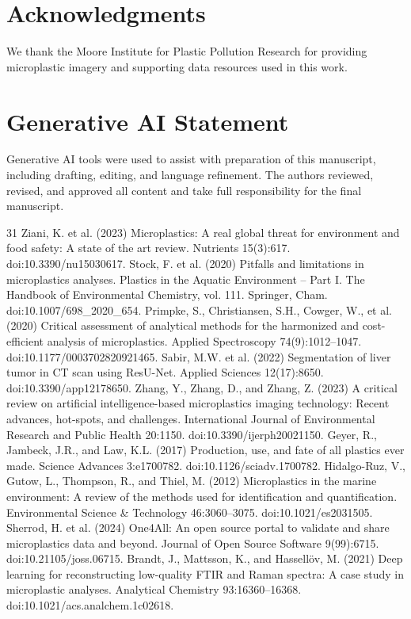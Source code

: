 \documentclass[11pt]{article}
\begin{document}
\section*{Acknowledgments}
We thank the Moore Institute for Plastic Pollution Research for providing microplastic imagery and supporting data resources used in this work.
\section*{Generative AI Statement}
Generative AI tools were used to assist with preparation of this manuscript, including drafting, editing, and language refinement. The authors reviewed, revised, and approved all content and take full responsibility for the final manuscript.
\begin{thebibliography}{31}
 Ziani, K. et al. (2023) Microplastics: A real global threat for environment and food safety: A state of the art review. Nutrients 15(3):617. doi:10.3390/nu15030617.
 Stock, F. et al. (2020) Pitfalls and limitations in microplastics analyses. Plastics in the Aquatic Environment -- Part I. The Handbook of Environmental Chemistry, vol. 111. Springer, Cham. doi:10.1007/698\_2020\_654.
 Primpke, S., Christiansen, S.H., Cowger, W., et al. (2020) Critical assessment of analytical methods for the harmonized and cost-efficient analysis of microplastics. Applied Spectroscopy 74(9):1012--1047. doi:10.1177/0003702820921465.
 Sabir, M.W. et al. (2022) Segmentation of liver tumor in CT scan using ResU-Net. Applied Sciences 12(17):8650. doi:10.3390/app12178650.
 Zhang, Y., Zhang, D., and Zhang, Z. (2023) A critical review on artificial intelligence-based microplastics imaging technology: Recent advances, hot-spots, and challenges. International Journal of Environmental Research and Public Health 20:1150. doi:10.3390/ijerph20021150.
 Geyer, R., Jambeck, J.R., and Law, K.L. (2017) Production, use, and fate of all plastics ever made. Science Advances 3:e1700782. doi:10.1126/sciadv.1700782.
 Hidalgo-Ruz, V., Gutow, L., Thompson, R., and Thiel, M. (2012) Microplastics in the marine environment: A review of the methods used for identification and quantification. Environmental Science \& Technology 46:3060--3075. doi:10.1021/es2031505.
 Sherrod, H. et al. (2024) One4All: An open source portal to validate and share microplastics data and beyond. Journal of Open Source Software 9(99):6715. doi:10.21105/joss.06715.
 Brandt, J., Mattsson, K., and Hassellöv, M. (2021) Deep learning for reconstructing low-quality FTIR and Raman spectra: A case study in microplastic analyses. Analytical Chemistry 93:16360--16368. doi:10.1021/acs.analchem.1c02618.

\end{thebibliography}
\end{document}

